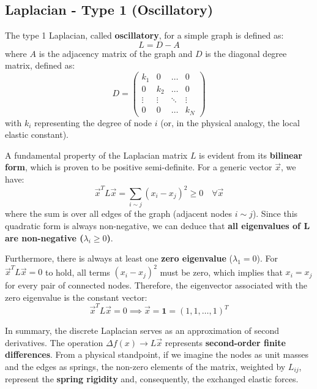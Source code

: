 \subsection{Laplacian - Type 1 (Oscillatory)}
The type 1 Laplacian, called \textbf{oscillatory}, for a simple graph is defined as:
\[
    L = D - A
\]
where \( A \) is the adjacency matrix of the graph and \( D \) is the diagonal degree matrix, defined as:
\[
    D =
    \begin{pmatrix}
        k_1    & 0      & \dots  & 0      \\
        0      & k_2    & \dots  & 0      \\
        \vdots & \vdots & \ddots & \vdots \\
        0      & 0      & \dots  & k_N
    \end{pmatrix}
\]
with \( k_i \) representing the degree of node \( i \) (or, in the physical analogy, the local elastic constant).

A fundamental property of the Laplacian matrix \( L \) is evident from its \textbf{bilinear form}, which is proven to be positive semi-definite. For a generic vector \( \vec{x} \), we have:
\[
    \vec{x}^T L \vec{x} = \sum_{i \sim j} (x_i - x_j)^2 \geq 0 \quad \forall \vec{x}
\]
where the sum is over all edges of the graph (adjacent nodes \( i \sim j \)). Since this quadratic form is always non-negative, we can deduce that \textbf{all eigenvalues of \( \boldsymbol{L} \) are non-negative (\( \lambda_i \geq 0 \))}.

Furthermore, there is always at least one \textbf{zero eigenvalue} (\( \lambda_1 = 0 \)). For \( \vec{x}^T L \vec{x} = 0 \) to hold, all terms \( (x_i - x_j)^2 \) must be zero, which implies that \( x_i = x_j \) for every pair of connected nodes. Therefore, the eigenvector associated with the zero eigenvalue is the constant vector:
\[
    \vec{x}^T L \vec{x} = 0 \implies \vec{x} = \mathbf{1} = (1, 1, \dots, 1)^T
\]

In summary, the discrete Laplacian serves as an approximation of second derivatives. The operation \( \Delta f(x) \rightarrow L\vec{x} \) represents \textbf{second-order finite differences}. From a physical standpoint, if we imagine the nodes as unit masses and the edges as springs, the non-zero elements of the matrix, weighted by \( L_{ij} \), represent the \textbf{spring rigidity} and, consequently, the exchanged elastic forces.

